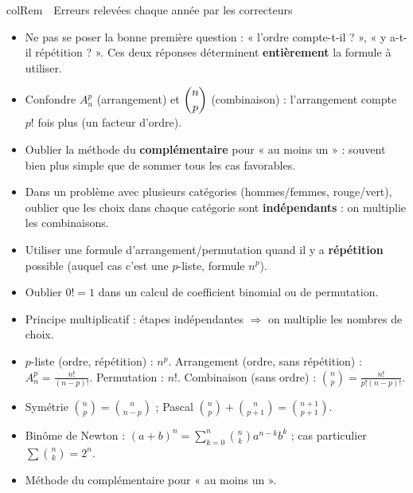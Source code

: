 \documentclass[11pt,a4paper]{article}
\newenvironment{remarque}[1][Remarque]
  {\begin{fiche}{colRem}{\ding{43}~~#1}}{\end{fiche}}
\begin{document}
\begin{remarque}[Erreurs relevées chaque année par les correcteurs]
\begin{itemize}[leftmargin=6mm, itemsep=0.5mm]
  \item Ne pas se poser la bonne première question : « l'ordre compte-t-il ? », « y a-t-il répétition ? ». Ces deux réponses déterminent \textbf{entièrement} la formule à utiliser.
  \item Confondre $A_n^p$ (arrangement) et $\dbinom np$ (combinaison) : l'arrangement compte $p!$ fois plus (un facteur d'ordre).
  \item Oublier la méthode du \textbf{complémentaire} pour « au moins un » : souvent bien plus simple que de sommer tous les cas favorables.
  \item Dans un problème avec plusieurs catégories (hommes/femmes, rouge/vert), oublier que les choix dans chaque catégorie sont \textbf{indépendants} : on multiplie les combinaisons.
  \item Utiliser une formule d'arrangement/permutation quand il y a \textbf{répétition} possible (auquel cas c'est une $p$-liste, formule $n^p$).
  \item Oublier $0!=1$ dans un calcul de coefficient binomial ou de permutation.
\end{itemize}
\end{remarque}

\vspace{4mm}
\begin{tcolorbox}[
  enhanced, boxrule=0pt, arc=2mm,
  interior style={left color=qtealdark, right color=qteal},
  left=6mm, right=6mm, top=4mm, bottom=4mm,
  fontupper=\color{white}\sffamily,
  title={\sffamily\bfseries\color{white}\ding{72}~~À retenir},
  colbacktitle=qtealdark, coltitle=white, boxrule=0pt
]
\begin{itemize}[leftmargin=6mm, label={\color{qamber}}, itemsep=1mm]
  \item Principe multiplicatif : étapes indépendantes $\Rightarrow$ on multiplie les nombres de choix.
  \item $p$-liste (ordre, répétition) : $n^p$. Arrangement (ordre, sans répétition) : $A_n^p=\frac{n!}{(n-p)!}$. Permutation : $n!$. Combinaison (sans ordre) : $\binom np=\frac{n!}{p!(n-p)!}$.
  \item Symétrie $\binom np=\binom n{n-p}$ ; Pascal $\binom np+\binom n{p+1}=\binom{n+1}{p+1}$.
  \item Binôme de Newton : $(a+b)^n=\sum_{k=0}^n\binom nk a^{n-k}b^k$ ; cas particulier $\sum\binom nk=2^n$.
  \item Méthode du complémentaire pour « au moins un ».
\end{itemize}
\end{tcolorbox}
\end{document}
